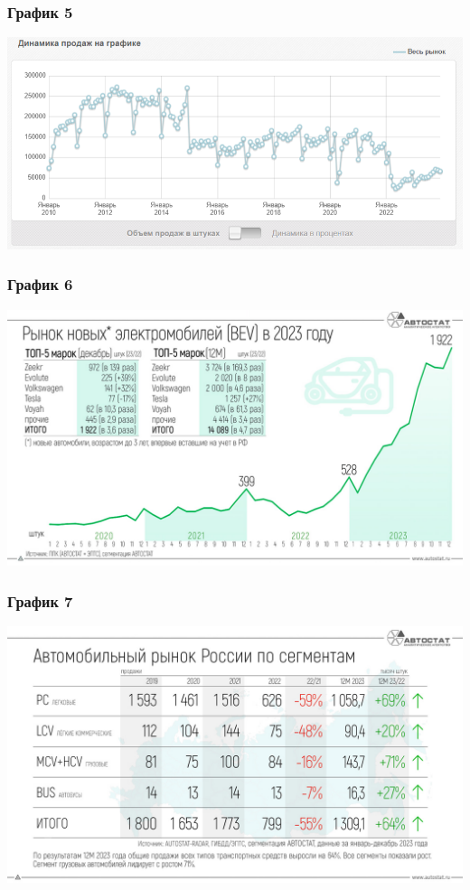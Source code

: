 \begin{frame}
    \frametitle{График 5}
    \begin{center}
        \centering
        \includegraphics[width=1\linewidth]{Media/Images/plot-5.png}
    \end{center}
\end{frame}

\begin{frame}
    \frametitle{График 6}
    \begin{center}
        \centering
        \includegraphics[width=1\linewidth]{Media/Images/plot-6.png}
    \end{center}
\end{frame}

\begin{frame}
    \frametitle{График 7}
    \begin{center}
        \centering
        \includegraphics[width=1\linewidth]{Media/Images/plot-7.png}
    \end{center}
\end{frame}

